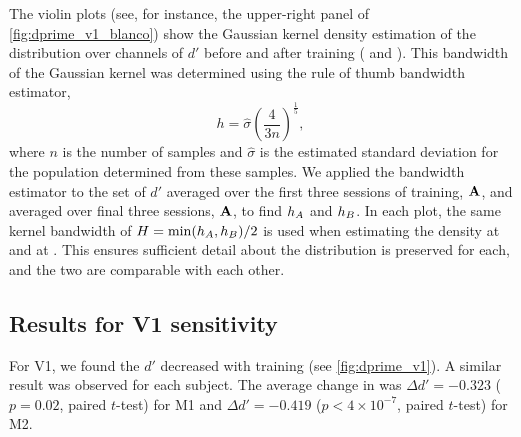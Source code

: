 The violin plots (see, for instance, the upper-right panel of \autoref{fig:dprime_v1_blanco}) show the Gaussian kernel density estimation of the distribution over channels of $d'$ before and after training ( and ).
This bandwidth of the Gaussian kernel was determined using the rule of thumb bandwidth estimator,
\begin{equation}
h = \hat{\sigma} \left( \frac{4}{3 n} \right) ^ \frac{1}{5}
,\label{eq:estimate-bw}\end{equation}
where $n$ is the number of samples and $\hat{\sigma}$ is the estimated standard deviation for the population determined from these samples.
We applied the bandwidth estimator to the set of $d'$ averaged over the first three sessions of training, $\mathbf{A}$, and averaged over final three sessions, $\mathbf{A}$, to find $h_{A}$ and $h_{B}$.
In each plot, the same kernel bandwidth of
$H = \min(h_{A}, h_{B}) / 2$
is used when estimating the density at  and at .
This ensures sufficient detail about the distribution is preserved for each, and the two are comparable with each other.

\subsection{Results for \acs{V1} sensitivity}


For \ac{V1}, we found the $d'$ decreased with training (see \autoref{fig:dprime_v1}).
A similar result was observed for each subject.
The average change in was $\Delta d' = -0.323$ ($p=0.02$, paired $t$-test) for \ac{M1} and $\Delta d' = -0.419$ ($p < 4 \times 10 ^{-7}$, paired $t$-test) for \ac{M2}.
 
